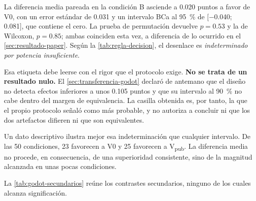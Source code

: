 
La diferencia media pareada en la condici\'on B asciende a \num{0.020} puntos a favor de V0,
con un error est\'andar de \num{0.031} y un intervalo BCa al \SI{95}{\percent} de
{[\num{-0.040};\,\num{0.081}]}, que contiene el cero. La prueba de permutaci\'on devuelve
$p = \num{0.53}$ y la de Wilcoxon, $p = \num{0.85}$; ambas coinciden esta vez, a diferencia
de lo ocurrido en el \cref{sec:resultado-paper}. Seg\'un la \cref{tab:regla-decision}, el
desenlace es \emph{indeterminado por potencia insuficiente}.

Esa etiqueta debe leerse con el rigor que el protocolo exige. \textbf{No se trata de un
resultado nulo.} El \cref{sec:transferencia-godot} declar\'o de antemano que el dise\~no no
detecta efectos inferiores a unos \num{0.105} puntos y que su intervalo al \SI{90}{\percent}
no cabe dentro del margen de equivalencia. La casilla obtenida es, por tanto, la que el
propio protocolo se\~nal\'o como m\'as probable, y no autoriza a concluir ni que los dos
artefactos difieren ni que son equivalentes.

Un dato descriptivo ilustra mejor esa indeterminaci\'on que cualquier intervalo. De las
\num{50} condiciones, \num{23} favorecen a V0 y \num{25} favorecen a V\textsubscript{pub}.
La diferencia media no procede, en consecuencia, de una superioridad consistente, sino de la
magnitud alcanzada en unas pocas condiciones.


La \cref{tab:godot-secundarios} re\'une los contrastes secundarios, ninguno de los cuales
alcanza significaci\'on.

